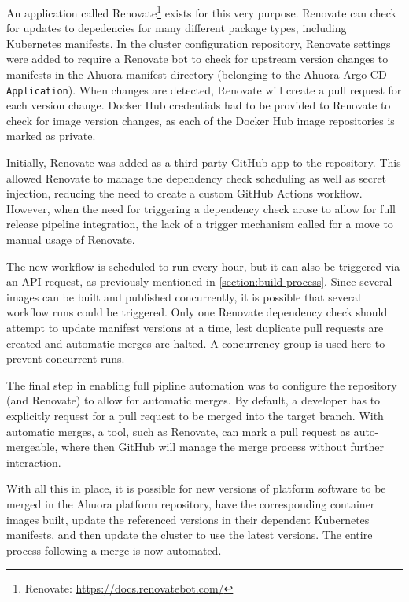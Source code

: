 An application called Renovate\footnote{Renovate: \url{https://docs.renovatebot.com/}} exists for this very purpose. Renovate can check for updates to depedencies for many different package types, including Kubernetes manifests. In the cluster configuration repository, Renovate settings were added to require a Renovate bot to check for upstream version changes to manifests in the Ahuora manifest directory (belonging to the Ahuora Argo CD \verb|Application|). When changes are detected, Renovate will create a pull request  for each version change. Docker Hub credentials had to be provided to Renovate to check for image version changes, as each of the Docker Hub image repositories is marked as private.

Initially, Renovate was added as a third-party GitHub app to the repository. This allowed Renovate to manage the dependency check scheduling as well as secret injection, reducing the need to create a custom GitHub Actions workflow. However, when the need for triggering a dependency check arose to allow for full release pipeline integration, the lack of a trigger mechanism called for a move to manual usage of Renovate.

The new workflow is scheduled to run every hour, but it can also be triggered via an API request, as previously mentioned in \ref{section:build-process}. Since several images can be built and published concurrently, it is possible that several workflow runs could be triggered. Only one Renovate dependency check should attempt to update manifest versions at a time, lest duplicate pull requests are created and automatic merges are halted. A concurrency group is used here to prevent concurrent runs.

The final step in enabling full pipline automation was to configure the repository (and Renovate) to allow for automatic merges. By default, a developer has to explicitly request for a pull request to be merged into the target branch. With automatic merges, a tool, such as Renovate, can mark a pull request as auto-mergeable, where then GitHub will manage the merge process without further interaction.

With all this in place, it is possible for new versions of platform software to be merged in the Ahuora platform repository, have the corresponding container images built, update the referenced versions in their dependent Kubernetes manifests, and then update the cluster to use the latest versions. The entire process following a merge is now automated.

